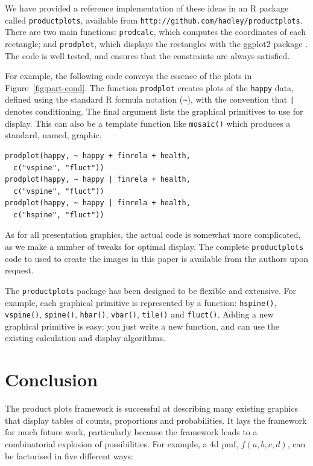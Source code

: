 \documentclass[journal]{vgtc}
\begin{document}
We have provided a reference implementation of these ideas in an R \citep{R} package called {\tt productplots}, available from {\tt http://github.com/hadley/productplots}. There are two main functions: {\tt prodcalc}, which computes the coordinates of each rectangle; and {\tt prodplot}, which displays the rectangles with the ggplot2 package \citep{me:ggplot2}. The code is well tested, and ensures that the constraints are always satisfied. 

For example, the following code conveys the essence of the plots in Figure~\ref{fig:part-cond}. The function {\tt prodplot} creates plots of the {\tt happy} data, defined using the standard R formula notation (\verb|~|), with the convention that {\tt |} denotes conditioning. The final argument lists the graphical primitives to use for display. This can also be a template function like {\tt mosaic()} which produces a standard, named, graphic.

\begin{verbatim}
prodplot(happy, ~ happy + finrela + health, 
  c("vspine", "fluct"))
prodplot(happy, ~ happy | finrela + health, 
  c("vspine", "fluct"))
prodplot(happy, ~ happy | finrela + health, 
  c("hspine", "fluct"))
\end{verbatim}

As for all presentation graphics, the actual code is somewhat more complicated, as we make a number of tweaks for optimal display. The complete {\tt productplots} code to used to create the images in this paper is available from the authors upon request. 

The {\tt productplots} package has been designed to be flexible and extensive.  For example, each graphical primitive is represented by a function: {\tt hspine()}, {\tt vspine()}, {\tt spine()}, {\tt hbar()}, {\tt vbar()}, {\tt tile()} and {\tt fluct()}. Adding a new graphical primitive is easy: you just write a new function, and can use the existing calculation and display algorithms.

\section{Conclusion}
\label{sec:conclusion}

The product plots framework is successful at describing many existing graphics that display tables of counts, proportions and probabilities. It lays the framework for much future work, particularly because the framework leads to a combinatorial explosion of possibilities. For example, a 4d {\sc pmf}, $f(a, b, c, d)$, can be factorised in five different ways:
\end{document}
